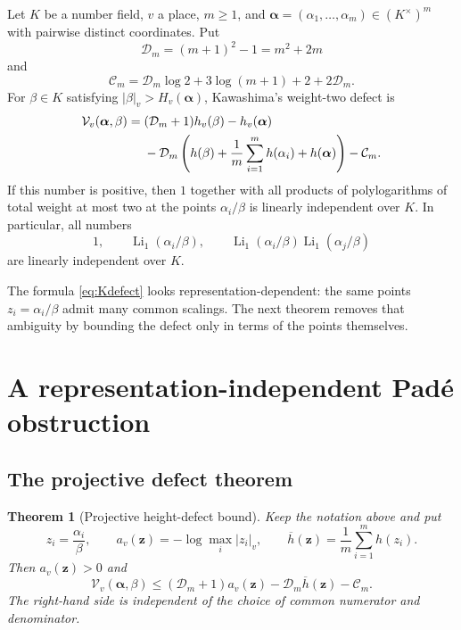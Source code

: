 \documentclass[11pt]{article}
\newtheorem{theorem}{Theorem}[section]
\theoremstyle{definition}
\newcommand{\Li}{\operatorname{Li}}
\newcommand{\D}{\mathcal D}
\newcommand{\Kc}{\mathcal C}
\newcommand{\Vdef}{\mathcal V}
\begin{document}
Let $K$ be a number field, $v$ a place, $m\ge1$, and
$\boldsymbol\alpha=(\alpha_1,\ldots,\alpha_m)\in(K^\times)^m$ with pairwise distinct
coordinates.  Put
\[
  \D_m=(m+1)^2-1=m^2+2m
\]
and
\begin{equation}\label{eq:Cm}
  \Kc_m=\D_m\log2+3\log(m+1)+2+2\D_m.
\end{equation}
For $\beta\in K$ satisfying $|\beta|_v>H_v(\boldsymbol\alpha)$, Kawashima's weight-two defect
is
\begin{align}\label{eq:Kdefect}
 \Vdef_v(\boldsymbol\alpha,\beta)
  ={}&(\D_m+1)h_v(\beta)-h_v(\boldsymbol\alpha)\\
    &-\D_m\left(h(\beta)+\frac1m\sum_{i=1}^m h(\alpha_i)
                     +h(\boldsymbol\alpha)\right)-\Kc_m.\notag
\end{align}
If this number is positive, then $1$ together with all products of polylogarithms of total
weight at most two at the points $\alpha_i/\beta$ is linearly independent over $K$.
In particular, all numbers
\[
  1,\qquad \Li_1(\alpha_i/\beta),\qquad
  \Li_1(\alpha_i/\beta)\Li_1(\alpha_j/\beta)
\]
are linearly independent over $K$.

The formula \eqref{eq:Kdefect} looks representation-dependent: the same points
$z_i=\alpha_i/\beta$ admit many common scalings.  The next theorem removes that ambiguity by
bounding the defect only in terms of the points themselves.

\section{A representation-independent Pad\'e obstruction}

\subsection{The projective defect theorem}

\begin{theorem}[Projective height-defect bound]\label{thm:projective-defect}
Keep the notation above and put
\[
  z_i=\frac{\alpha_i}{\beta},\qquad
  a_v(\mathbf z)=-\log\max_i|z_i|_v,
  \qquad
  \overline h(\mathbf z)=\frac1m\sum_{i=1}^m h(z_i).
\]
Then $a_v(\mathbf z)>0$ and
\begin{equation}\label{eq:projective-bound}
  \boxed{\quad
  \Vdef_v(\boldsymbol\alpha,\beta)
  \le (\D_m+1)a_v(\mathbf z)-\D_m\overline h(\mathbf z)-\Kc_m.
  \quad}
\end{equation}
The right-hand side is independent of the choice of common numerator and denominator.
\end{theorem}
\end{document}
